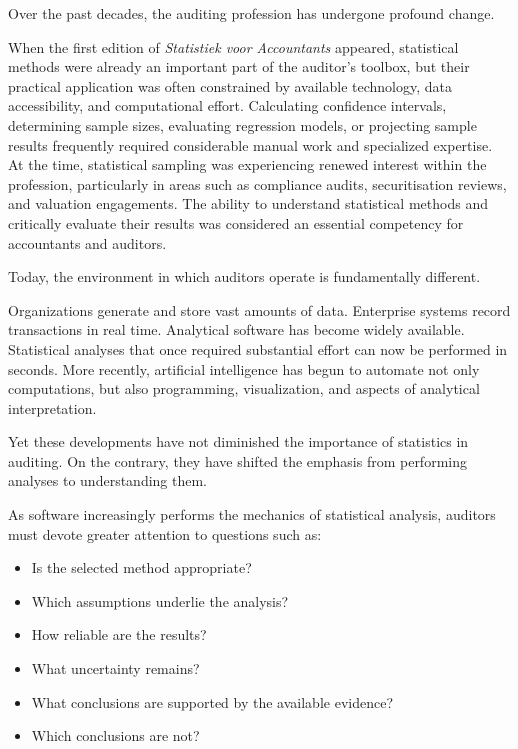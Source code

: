 \raggedbottom
Over the past decades, the auditing profession has undergone profound change.

When the first edition of \emph{Statistiek voor Accountants} appeared, statistical methods were already an important part of the auditor’s toolbox, but their practical application was often constrained by available technology, data accessibility, and computational effort. Calculating confidence intervals, determining sample sizes, evaluating regression models, or projecting sample results frequently required considerable manual work and specialized expertise. At the time, statistical sampling was experiencing renewed interest within the profession, particularly in areas such as compliance audits, securitisation reviews, and valuation engagements. The ability to understand statistical methods and critically evaluate their results was considered an essential competency for accountants and auditors.

\bigskip
Today, the environment in which auditors operate is fundamentally different.

Organizations generate and store vast amounts of data. Enterprise systems record transactions in real time. Analytical software has become widely available. Statistical analyses that once required substantial effort can now be performed in seconds. More recently, artificial intelligence has begun to automate not only computations, but also programming, visualization, and aspects of analytical interpretation.

Yet these developments have not diminished the importance of statistics in auditing. On the contrary, they have shifted the emphasis from performing analyses to understanding them.

As software increasingly performs the mechanics of statistical analysis, auditors must devote greater attention to questions such as:

\begin{itemize}
\item Is the selected method appropriate?
\item Which assumptions underlie the analysis?
\item How reliable are the results?
\item What uncertainty remains?
\item What conclusions are supported by the available evidence?
\item Which conclusions are not?
\end{itemize}

